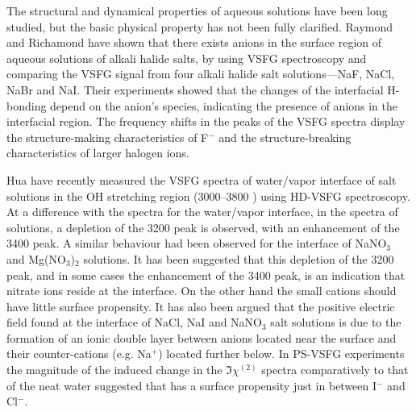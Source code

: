 The structural and dynamical properties of aqueous solutions have been long studied, but the basic physical
property has not been fully clarified.
Raymond and Richamond\cite{Raymond2004} have shown that there exists anions in the surface region of aqueous solutions of alkali halide salts, 
by using VSFG spectroscopy and comparing the VSFG signal from four alkali halide salt solutions---NaF, NaCl, NaBr 
and NaI. Their experiments showed that the changes of the interfacial H-bonding depend on the anion's species, 
indicating the presence of anions in the interfacial region. The frequency shifts in the peaks of the VSFG spectra display the structure-making characteristics
of F$^-$ and the structure-breaking characteristics of larger halogen ions.

%
Hua \etal\cite{HuaWei2014} have recently measured the VSFG spectra of water/vapor interface of \LiN salt solutions in the OH stretching region
(3000--3800 \centimeter) using HD-VSFG spectroscopy\cite{HuaWei2011,HuaWei2011b,ChenXiangKe2010}. 
At a difference with the spectra for the water/vapor interface, in the spectra of 
\LiN solutions, a depletion of the 3200 \cm peak is observed, with an 
enhancement of the 3400 \cm peak.
A similar behaviour had been observed for the interface of NaNO$_3$ and 
Mg(NO$_3$)$_2$ solutions\cite{AJ12,HuaWei2014}. It has been 
suggested that this depletion of the 3200 \cm peak, and in some cases 
the enhancement of the 3400 \cm peak, is an indication that nitrate 
ions reside at the interface. On the other hand the small 
cations should have little surface propensity. 
It has also been argued that the positive electric field found at the interface of NaCl, NaI and 
NaNO$_3$ salt solutions is due to the formation of an ionic double layer 
between anions located near the surface and their counter-cations (e.g.
Na$^+$) located further below. In PS-VSFG experiments the 
magnitude of the induced change in the $\Im\chi^{(2)}$ spectra comparatively
to that of the neat water suggested that \nitrate has a surface propensity 
just in between I$^-$ and Cl$^-$\cite{Verreault2013,Verreault2009}. 



